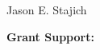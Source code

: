 \documentclass[10pt]{article}
\begin{document}
\begin{cv}{\centerline{Jason E. Stajich}}
\begin{cvlistcompact}{\bf Grant Support:}
\end{cvlistcompact}

%

\end{cv}
\end{document}
